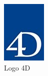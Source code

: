 \begin{figure}[h]
    \centering
    \includegraphics[scale=0.8]{Images/logo-4d.jpg} %
    \caption{Logo 4D}
    \label{fig:Logo4D}
\end{figure}









